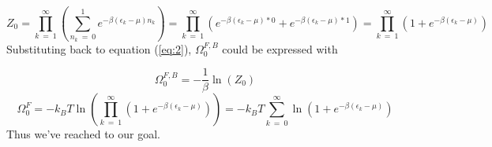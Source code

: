 \begin{equation} \label{eq:10}
Z_{0}
=
\prod_{k\ =\ 1}^{\infty}
\left(
\sum_{n_{k}\ =\ 0}^{1} e^{-\beta \left( \epsilon_{k} - \mu \right) n_{k}}
\right)
=
\prod_{k\ =\ 1}^{\infty}
\left(
e^{-\beta \left( \epsilon_{k} - \mu \right) * 0}
+
e^{-\beta \left( \epsilon_{k} - \mu \right) * 1}
\right)
=
\prod_{k\ =\ 1}^{\infty}
\left(
1
+
e^{-\beta \left( \epsilon_{k} - \mu \right)}
\right)
\end{equation}
Substituting back to equation (\ref{eq:2}), $\Omega_{0}^{F,B}$ could be expressed with

\begin{equation}
\Omega_{0}^{F,B}
=
- \frac{1}{\beta} \ln \left( Z_{0} \right)
\end{equation}
\begin{equation}
\Omega_{0}^{F}
=
-k_{B} T \ln \left(
\prod_{k\ =\ 1}^{\infty}
\left(
1
+
e^{-\beta \left( \epsilon_{k} - \mu \right)}
\right)
\right)
=
-k_{B} T \sum_{k\ =\ 0}^{\infty} \ln \left( 1 + e^{-\beta \left( \epsilon_{k} - \mu \right)} \right)
\end{equation}
Thus we've reached to our goal.